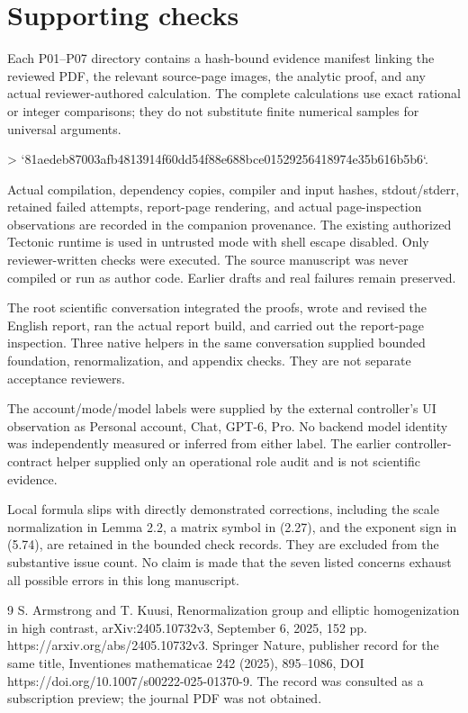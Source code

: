 \documentclass[10pt]{article}
\begin{document}
\section*{Supporting checks}
Each P01–P07 directory contains a hash-bound evidence manifest linking the reviewed PDF, the relevant source-page images, the analytic proof, and any actual reviewer-authored calculation. The complete calculations use exact rational or integer comparisons; they do not substitute finite numerical samples for universal arguments.\par
> `81aedeb87003afb4813914f60dd54f88e688bce01529256418974e35b616b5b6`.\par
Actual compilation, dependency copies, compiler and input hashes, stdout/stderr, retained failed attempts, report-page rendering, and actual page-inspection observations are recorded in the companion provenance. The existing authorized Tectonic runtime is used in untrusted mode with shell escape disabled. Only reviewer-written checks were executed. The source manuscript was never compiled or run as author code. Earlier drafts and real failures remain preserved.\par
The root scientific conversation integrated the proofs, wrote and revised the English report, ran the actual report build, and carried out the report-page inspection. Three native helpers in the same conversation supplied bounded foundation, renormalization, and appendix checks. They are not separate acceptance reviewers.\par
The account/mode/model labels were supplied by the external controller’s UI observation as Personal account, Chat, GPT-6, Pro. No backend model identity was independently measured or inferred from either label. The earlier controller-contract helper supplied only an operational role audit and is not scientific evidence.\par
Local formula slips with directly demonstrated corrections, including the scale normalization in Lemma 2.2, a matrix symbol in (2.27), and the exponent sign in (5.74), are retained in the bounded check records. They are excluded from the substantive issue count. No claim is made that the seven listed concerns exhaust all possible errors in this long manuscript.\par
9 S. Armstrong and T. Kuusi, Renormalization group and elliptic homogenization in high contrast, arXiv:2405.10732v3, September 6, 2025, 152 pp. https://arxiv.org/abs/2405.10732v3. Springer Nature, publisher record for the same title, Inventiones mathematicae 242 (2025), 895–1086, DOI https://doi.org/10.1007/s00222-025-01370-9. The record was consulted as a subscription preview; the journal PDF was not obtained.\par
\end{document}
